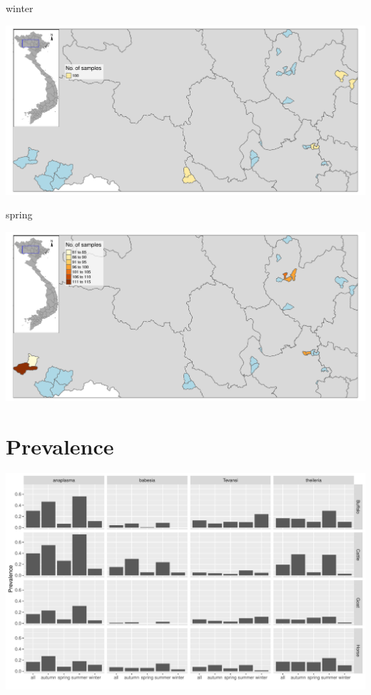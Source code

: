 \begin{frame}
winter\\
\begin{center}
\includegraphics[width=1\textwidth]{map02_winter.pdf}
\end{center}
\end{frame}


\begin{frame}
spring\\
\begin{center}
\includegraphics[width=1\textwidth]{map02_spring.pdf}
\end{center}
\end{frame}

\section{Prevalence}
\begin{frame}
\begin{center}
\includegraphics[width=1\textwidth]{fig_prev01.pdf}
\end{center}
\end{frame}


